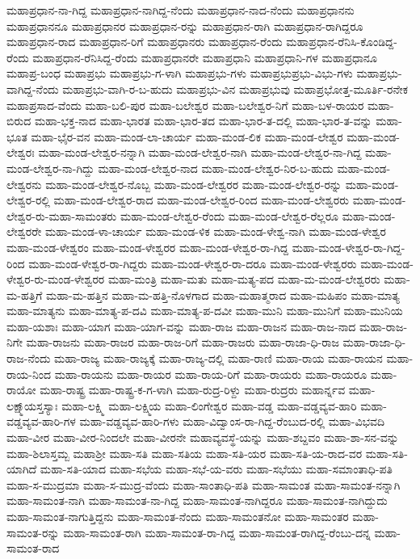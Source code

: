 ಮಹಾಪ್ರಧಾನ-ನಾ-ಗಿದ್ದ
ಮಹಾಪ್ರಧಾನ-ನಾಗಿದ್ದ-ನೆಂದು
ಮಹಾಪ್ರಧಾನ-ನಾದ-ನೆಂದು
ಮಹಾಪ್ರಧಾನನು
ಮಹಾಪ್ರಧಾನನೂ
ಮಹಾಪ್ರಧಾನರ
ಮಹಾಪ್ರಧಾನ-ರನ್ನು
ಮಹಾಪ್ರಧಾನ-ರಾಗಿ
ಮಹಾಪ್ರಧಾನ-ರಾಗಿದ್ದರೂ
ಮಹಾಪ್ರಧಾನ-ರಾದ
ಮಹಾಪ್ರಧಾನ-ರಿಗೆ
ಮಹಾಪ್ರಧಾನರು
ಮಹಾಪ್ರಧಾನ-ರೆಂದು
ಮಹಾಪ್ರಧಾನ-ರೆನಿಸಿ-ಕೊಂಡಿದ್ದ-ರೆಂದು
ಮಹಾಪ್ರಧಾನ-ರೆನಿಸಿದ್ದ-ರೆಂದು
ಮಹಾಪ್ರಧಾನರೇ
ಮಹಾಪ್ರಧಾನಿ
ಮಹಾಪ್ರಧಾನಿ-ಗಳ
ಮಹಾಪ್ರಧಾನೂ
ಮಹಾಪ್ರ-ಬಂಧ
ಮಹಾಪ್ರಭು
ಮಹಾಪ್ರಭು-ಗ-ಳಾಗಿ
ಮಹಾಪ್ರಭು-ಗಳು
ಮಹಾಪ್ರಭುಪ್ರಭು-ವಿಭು-ಗಳು
ಮಹಾಪ್ರಭು-ವಾಗಿದ್ದ-ನೆಂದು
ಮಹಾಪ್ರಭು-ವಾಗಿ-ರ-ಬ-ಹುದು
ಮಹಾಪ್ರಭು-ವಿನ
ಮಹಾಪ್ರಭುವು
ಮಹಾಪ್ರಭೋತ್ತ-ಮೂರ್ತಿ-ರನೇಕ
ಮಹಾಪ್ರಸಾದ-ವೆಂದು
ಮಹಾ-ಬಲಿ-ಪುರ
ಮಹಾ-ಬಲೇಶ್ವರ
ಮಹಾ-ಬಲೇಶ್ವರ-ನಿಗೆ
ಮಹಾ-ಬಳ-ರಾಯರ
ಮಹಾ-ಬಿರುದ
ಮಹಾ-ಭಕ್ತ-ನಾದ
ಮಹಾ-ಭಾರತ
ಮಹಾ-ಭಾರ-ತದ
ಮಹಾ-ಭಾರ-ತ-ದಲ್ಲಿ
ಮಹಾ-ಭಾರ-ತ-ವನ್ನು
ಮಹಾ-ಭೂತ
ಮಹಾ-ಭೈರ-ವನ
ಮಹಾ-ಮಂಡ-ಲಾ-ಚಾರ್ಯ
ಮಹಾ-ಮಂಡ-ಲಿಕ
ಮಹಾ-ಮಂಡ-ಲೇಶ್ವರ
ಮಹಾ-ಮಂಡ-ಲೇಶ್ವರಃ
ಮಹಾ-ಮಂಡ-ಲೇಶ್ವರ-ನನ್ನಾಗಿ
ಮಹಾ-ಮಂಡ-ಲೇಶ್ವರ-ನಾಗಿ
ಮಹಾ-ಮಂಡ-ಲೇಶ್ವರ-ನಾ-ಗಿದ್ದ
ಮಹಾ-ಮಂಡ-ಲೇಶ್ವರ-ನಾ-ಗಿದ್ದು
ಮಹಾ-ಮಂಡ-ಲೇಶ್ವರ-ನಾದ
ಮಹಾ-ಮಂಡ-ಲೇಶ್ವರ-ನಿರ-ಬ-ಹುದು
ಮಹಾ-ಮಂಡ-ಲೇಶ್ವರನು
ಮಹಾ-ಮಂಡ-ಲೇಶ್ವರ-ನೊಬ್ಬ
ಮಹಾ-ಮಂಡ-ಲೇಶ್ವರರ
ಮಹಾ-ಮಂಡ-ಲೇಶ್ವರ-ರನ್ನು
ಮಹಾ-ಮಂಡ-ಲೇಶ್ವರ-ರಲ್ಲಿ
ಮಹಾ-ಮಂಡ-ಲೇಶ್ವರ-ರಾದ
ಮಹಾ-ಮಂಡ-ಲೇಶ್ವರ-ರಿಂದ
ಮಹಾ-ಮಂಡ-ಲೇಶ್ವರರು
ಮಹಾ-ಮಂಡ-ಲೇಶ್ವರ-ರು-ಮಹಾ-ಸಾಮಂತರು
ಮಹಾ-ಮಂಡ-ಲೇಶ್ವರ-ರೆಂದು
ಮಹಾ-ಮಂಡ-ಲೇಶ್ವರ-ರೆಲ್ಲರೂ
ಮಹಾ-ಮಂಡ-ಲೇಶ್ವರರೇ
ಮಹಾ-ಮಂಡ-ಳಾ-ಚಾರ್ಯ
ಮಹಾ-ಮಂಡ-ಳಿಕ
ಮಹಾ-ಮಂಡ-ಳೇಶ್ವ-ನಾಗಿ
ಮಹಾ-ಮಂಡ-ಳೇಶ್ವರ
ಮಹಾ-ಮಂಡ-ಳೇಶ್ವರಂ
ಮಹಾ-ಮಂಡ-ಳೇಶ್ವರರ
ಮಹಾ-ಮಂಡ-ಳೇಶ್ವರ-ರಾ-ಗಿದ್ದ
ಮಹಾ-ಮಂಡ-ಳೇಶ್ವರ-ರಾ-ಗಿದ್ದ-ರಿಂದ
ಮಹಾ-ಮಂಡ-ಳೇಶ್ವರ-ರಾ-ಗಿದ್ದರು
ಮಹಾ-ಮಂಡ-ಳೇಶ್ವರ-ರಾ-ದರೂ
ಮಹಾ-ಮಂಡ-ಳೇಶ್ವರರು
ಮಹಾ-ಮಂಡ-ಳೇಶ್ವರ-ರು-ಮಂಡ-ಳೇಶ್ವರರ
ಮಹಾ-ಮಂತ್ರಿ
ಮಹಾ-ಮತು
ಮಹಾ-ಮತ್ಯ-ಪದ
ಮಹಾ-ಮ-ಮಂಡ-ಲೇಶ್ವರರು
ಮಹಾ-ಮ-ಹತ್ತಿಗೆ
ಮಹಾ-ಮ-ಹತ್ತಿನ
ಮಹಾ-ಮ-ಹತ್ತಿ-ನೊಳಗಾದ
ಮಹಾ-ಮಹಾತ್ಮರಾದ
ಮಹಾ-ಮಹಿಪಂ
ಮಹಾ-ಮಾತ್ಯ
ಮಹಾ-ಮಾತ್ಯನು
ಮಹಾ-ಮಾತ್ಯ-ಪ-ದವಿ
ಮಹಾ-ಮಾತ್ಯ-ಪ-ದವೀ
ಮಹಾ-ಮುನಿ
ಮಹಾ-ಮುನಿಗೆ
ಮಹಾ-ಮುನಿಯ
ಮಹಾ-ಯಶಾಃ
ಮಹಾ-ಯಾಗ
ಮಹಾ-ಯಾಗ-ವನ್ನು
ಮಹಾ-ರಾಜ
ಮಹಾ-ರಾಜನ
ಮಹಾ-ರಾಜ-ನಾದ
ಮಹಾ-ರಾಜ-ನಿಗೇ
ಮಹಾ-ರಾಜನು
ಮಹಾ-ರಾಜರ
ಮಹಾ-ರಾಜ-ರಿಗೆ
ಮಹಾ-ರಾಜರು
ಮಹಾ-ರಾಜಾ-ಧಿ-ರಾಜ
ಮಹಾ-ರಾಜಾ-ಧಿ-ರಾಜ-ನೆಂದು
ಮಹಾ-ರಾಜ್ಯ
ಮಹಾ-ರಾಜ್ಯಕ್ಕೆ
ಮಹಾ-ರಾಜ್ಯ-ದಲ್ಲಿ
ಮಹಾ-ರಾಣಿ
ಮಹಾ-ರಾಯ
ಮಹಾ-ರಾಯನ
ಮಹಾ-ರಾಯ-ನಿಂದ
ಮಹಾ-ರಾಯನು
ಮಹಾ-ರಾಯರ
ಮಹಾ-ರಾಯ-ರಿಗೆ
ಮಹಾ-ರಾಯರು
ಮಹಾ-ರಾಯರೂ
ಮಹಾ-ರಾಯೋ
ಮಹಾ-ರಾಷ್ಟ್ರ
ಮಹಾ-ರಾಷ್ಟ್ರ-ಕ-ಗ-ಳಾಗಿ
ಮಹಾ-ರುದ್ರ-ರಿಳ್ದು
ಮಹಾ-ರುದ್ರರು
ಮಹಾರ್ನ್ನವ
ಮಹಾ-ಲಕ್ಷ್ಮಾ್ಯಸ್ತಸ್ಯಾಃ
ಮಹಾ-ಲಕ್ಷ್ಮಿ
ಮಹಾ-ಲಕ್ಷ್ಮಿಯ
ಮಹಾ-ಲಿಂಗೇಶ್ವರ
ಮಹಾ-ವಡ್ಡ
ಮಹಾ-ವಡ್ಡವ್ಯವ-ಹಾರಿ
ಮಹಾ-ವಡ್ಡವ್ಯವ-ಹಾರಿ-ಗಳ
ಮಹಾ-ವಡ್ಡವ್ಯವ-ಹಾರಿ-ಗಳು
ಮಹಾ-ವಿದ್ವಾಂಸ-ರಾ-ಗಿದ್ದ-ರೆಂಬುದ-ರಲ್ಲಿ
ಮಹಾ-ವಿಭವದಿ
ಮಹಾ-ವೀರ
ಮಹಾ-ವೀರ-ನಿಂದಲೇ
ಮಹಾ-ವೀರನೇ
ಮಹಾವ್ಯವಸ್ಥೆ-ಯನ್ನು
ಮಹಾ-ಶಬ್ದವಂ
ಮಹಾ-ಶಾ-ಸನ-ವನ್ನು
ಮಹಾ-ಶಿಲಾಸ್ತಮ್ಬ
ಮಹಾಶ್ರೀ
ಮಹಾ-ಸತಿ
ಮಹಾ-ಸತಿಯ
ಮಹಾ-ಸತಿ-ಯರ
ಮಹಾ-ಸತಿ-ಯ-ರಾದ-ವರ
ಮಹಾ-ಸತಿ-ಯಾಗಿದೆ
ಮಹಾ-ಸತಿ-ಯಾದ
ಮಹಾ-ಸಭೆಯ
ಮಹಾ-ಸಭೆ-ಯ-ವರು
ಮಹಾ-ಸಭೆಯು
ಮಹಾ-ಸಮಾಂತಾಧಿ-ಪತಿ
ಮಹಾ-ಸ-ಮುದ್ರಮಾ
ಮಹಾ-ಸ-ಮುದ್ರ-ವೆಂದು
ಮಹಾ-ಸಾಂತಾಧಿ-ಪತಿ
ಮಹಾ-ಸಾಮಂತ
ಮಹಾ-ಸಾಮಂತ-ನನ್ನಾಗಿ
ಮಹಾ-ಸಾಮಂತ-ನಾಗಿ
ಮಹಾ-ಸಾಮಂತ-ನಾ-ಗಿದ್ದ
ಮಹಾ-ಸಾಮಂತ-ನಾಗಿದ್ದರೂ
ಮಹಾ-ಸಾಮಂತ-ನಾಗಿದ್ದುದು
ಮಹಾ-ಸಾಮಂತ-ನಾಗುತ್ತಿದ್ದನು
ಮಹಾ-ಸಾಮಂತ-ನೆಂದು
ಮಹಾ-ಸಾಮಂತನೋ
ಮಹಾ-ಸಾಮಂತರ
ಮಹಾ-ಸಾಮಂತ-ರನ್ನು
ಮಹಾ-ಸಾಮಂತ-ರಾಗಿ
ಮಹಾ-ಸಾಮಂತ-ರಾ-ಗಿದ್ದ
ಮಹಾ-ಸಾಮಂತ-ರಾಗಿದ್ದ-ರೆಂಬು-ದನ್ನ
ಮಹಾ-ಸಾಮಂತ-ರಾದ
